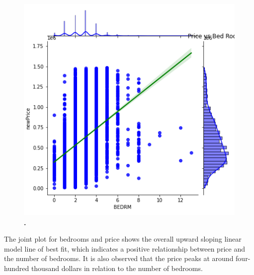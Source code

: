 \documentclass[12pt]{report}
\begin{document}
\begin{figure}[h]
\begin{center}
\includegraphics[width=130mm]{BedJoint.png}
\end{center}
\caption{\textbf{.}}
\label{fig:bedJoint}
\end{figure}
The joint plot for bedrooms and price shows the overall upward sloping linear model line of best fit, which indicates a positive relationship between price and the number of bedrooms. It is also observed that the price peaks at around four-hundred thousand dollars in relation to the number of bedrooms. 
\clearpage
\end{document}
